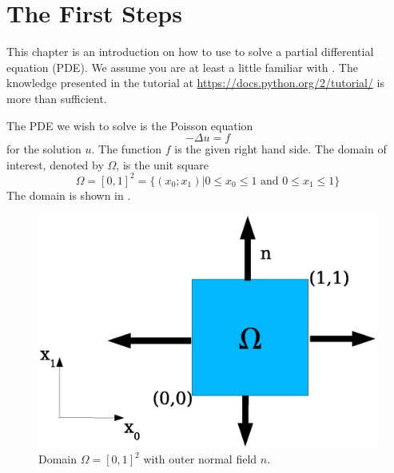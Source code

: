 
%
%
%

\section{The First Steps}\label{FirstSteps} 
This chapter is an introduction on how to use \escript to solve 
a partial differential equation (PDE).
We assume you are at least a little familiar with \PYTHON.
The knowledge presented in the \PYTHON tutorial at \url{https://docs.python.org/2/tutorial/} is more than sufficient.

The PDE we wish to solve is the Poisson equation 
\begin{equation}
    -\Delta u=f 
    \label{eq:FirstSteps.1}
\end{equation}
for the solution $u$. The function $f$ is the given right hand side. The domain of interest, denoted by $\Omega$,
is the unit square 
\begin{equation}
\Omega=[0,1]^2=\{ (x_0;x_1) | 0\le x_{0} \le 1 \mbox{ and } 0\le x_{1} \le 1 \}
\label{eq:FirstSteps.1b}
\end{equation}
The domain is shown in .
\begin{figure}[ht]
    \centerline{\includegraphics{FirstStepDomain}}
    \caption{Domain $\Omega=[0,1]^2$ with outer normal field $n$.}
    \label{fig:FirstSteps.1}
\end{figure}

